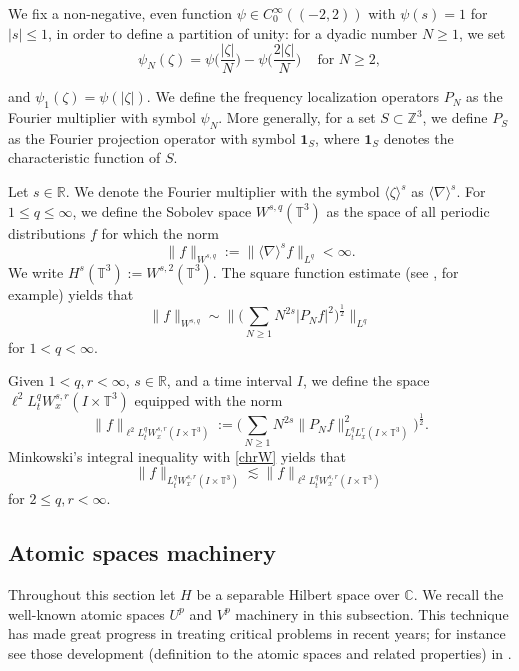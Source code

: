 \documentclass[letterpaper, 11pt,  reqno]{amsart}
\newcommand{\1}{\hspace{0.5mm}\text{I}\hspace{0.5mm}}
\newcommand{\noi}{\noindent}
\newcommand{\Z}{\mathbb{Z}}
\newcommand{\R}{\mathbb{R}}
\newcommand{\T}{\mathbb{T}}
\newcommand{\nb}{\nabla}
\renewcommand{\l}{\ell}
\newcommand{\les}{\lesssim}
\newcommand{\jb}[1]
{\langle #1 \rangle}
\newcommand{\ind}{\mathbf 1}
\newcommand{\N}{\mathbb{N}}
\numberwithin{equation}{section}
\numberwithin{theorem}{section}
\begin{document}
We fix a non-negative, even function $\psi\in C_0^\infty((-2,2))$ with $\psi(s)=1$ for $|s|\leq 1$,
in order to define a partition of unity:
for a dyadic number $N\geq 1$,
we set
\begin{equation*}
    \psi_N(\zeta)=\psi\Big(\frac{|\zeta|}{N}\Big)-\psi\Big(\frac{2|\zeta|}{N}\Big) \,
    \quad \text{for } N\geq 2,
\end{equation*}



\noi
and $  \psi_1(\zeta)=\psi(|\zeta|)$.
We define the frequency localization operators
$P_N$ as the Fourier multiplier with symbol $\psi_N$.
More generally, for a set $S\subset \Z^{3}$,
we define $P_S$ as the Fourier projection operator with symbol $\ind_S$, where $\ind_S$ denotes the characteristic function of $S$.



Let $s \in \R$.
We denote the Fourier multiplier with the symbol $\jb{\zeta}^s$ as $\jb{\nb}^s$.
For $1 \le q \le \infty$,
we define the Sobolev space $W^{s,q}(\T^3)$ as the space of all periodic distributions $f$ for which the norm
\[
\| f \|_{W^{s,q}}
:= \| \jb{\nb}^s f \|_{L^q}
< \infty.
\]
We write $H^s(\T^3) := W^{s,2}(\T^3)$.
The square function estimate (see \cite[Theorem 5 on page 104]{St70}, for example) yields that
\begin{equation}
\| f \|_{W^{s,q}}
\sim
\bigg\| \Big( \sum_{N \ge 1} N^{2s} |P_N f|^2 \Big)^{\frac 12} \bigg\|_{L^q}
\label{chrW}
\end{equation}
for $1<q<\infty$.

Given $1 <q,r<\infty$, $s \in \R$, and a time interval $I$,
we define
the space
$\l^2 L_t^q W_x^{s,r} (I \times \T^3)$
equipped with the norm
\[
\| f \|_{\l^2 L_t^q W_x^{s,r} (I \times \T^3)}
:=
\Big( \sum_{N \ge 1} N^{2s} \| P_N f\|_{L_t^q L_x^{r}(I \times \T^3)}^{2} \Big)^{\frac 12}
.
\]
Minkowski's integral inequality with \eqref{chrW} yields that
\begin{equation}
\| f \|_{L_t^q W_x^{s,r} (I \times \T^3)}
\les
\| f \|_{\l^2 L_t^q W_x^{s,r} (I \times \T^3)}
\label{sqLW}
\end{equation}
for $2 \le q,r < \infty$.




\subsection{Atomic spaces machinery}
Throughout this section let $H$ be a separable Hilbert space over $\mathbb C$.
We recall the well-known atomic spaces $U^{p}$
and $V^{p}$ machinery in this subsection.
This technique has made great progress in treating critical problems in recent years; 
for instance 
see those development (definition to the atomic spaces and related properties)
in \cite{HHK09, HTT11, HTT14, IP12, KT05}. 
\end{document}
